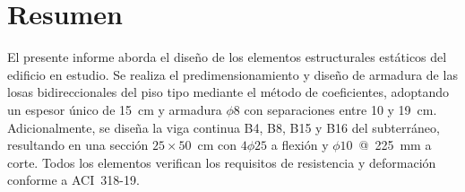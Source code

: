 \section*{Resumen}

El presente informe aborda el diseño de los elementos estructurales estáticos del edificio en estudio. Se realiza el predimensionamiento y diseño de armadura de las losas bidireccionales del piso tipo mediante el método de coeficientes, adoptando un espesor único de 15~cm y armadura $\phi$8 con separaciones entre 10 y 19~cm. Adicionalmente, se diseña la viga continua B4, B8, B15 y B16 del subterráneo, resultando en una sección $25\times50$~cm con $4\phi25$ a flexión y $\phi10$~@~225~mm a corte. Todos los elementos verifican los requisitos de resistencia y deformación conforme a ACI~318-19.